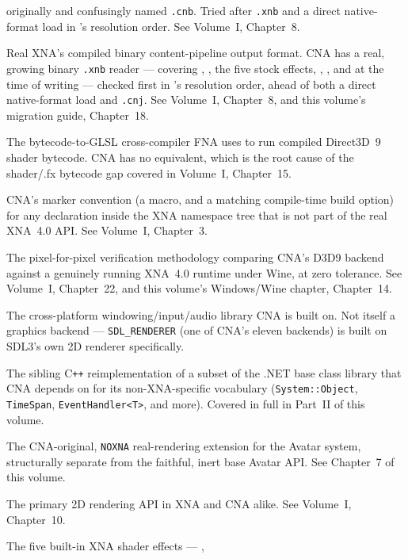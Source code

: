 \begin{description}
  originally and confusingly named \texttt{.cnb}. Tried after \texttt{.xnb} and a direct
  native-format load in 's resolution order. See Volume~I, Chapter~8.
\item[.xnb] Real XNA's compiled binary content-pipeline output format. CNA has a real, growing
  binary \texttt{.xnb} reader --- covering , , the
  five stock effects, , , and  at the
  time of writing --- checked first in 's resolution order, ahead of
  both a direct native-format load and \texttt{.cnj}. See Volume~I, Chapter~8, and this
  volume's migration guide, Chapter~18.
\item[MojoShader] The bytecode-to-GLSL cross-compiler FNA uses to run compiled Direct3D~9
  shader bytecode. CNA has no equivalent, which is the root cause of the shader/.fx bytecode
  gap covered in Volume~I, Chapter~15.
\item[NOXNA] CNA's marker convention (a macro, and a matching compile-time build option) for
  any declaration inside the XNA namespace tree that is not part of the real XNA~4.0 API. See
  Volume~I, Chapter~3.
\item[Oracle (D3D9)] The pixel-for-pixel verification methodology comparing CNA's D3D9
  backend against a genuinely running XNA~4.0 runtime under Wine, at zero tolerance. See
  Volume~I, Chapter~22, and this volume's Windows/Wine chapter, Chapter~14.
\item[SDL3] The cross-platform windowing/input/audio library CNA is built on. Not itself a
  graphics backend --- \texttt{SDL\_RENDERER} (one of CNA's eleven backends) is built on
  SDL3's own 2D renderer specifically.
\item[SharpRuntime / sharp-runtime] The sibling C\texttt{++} reimplementation of a subset of
  the .NET base class library that CNA depends on for its non-XNA-specific vocabulary
  (\texttt{System::Object}, \texttt{TimeSpan}, \texttt{EventHandler<T>}, and more). Covered in
  full in Part~II of this volume.
\item[SkinnedModelEXT] The CNA-original, \texttt{NOXNA} real-rendering extension for the
  Avatar system, structurally separate from the faithful, inert base Avatar API. See
  Chapter~7 of this volume.
\item[SpriteBatch] The primary 2D rendering API in XNA and CNA alike. See Volume~I, Chapter~10.
\item[Stock effects] The five built-in XNA shader effects --- ,

\end{description}
